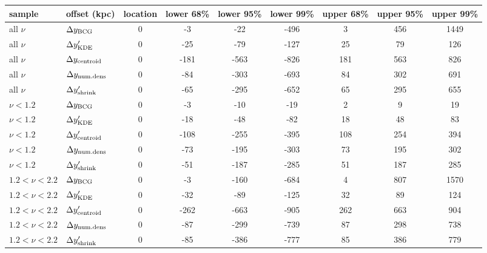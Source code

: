 \begin{tabular}{llccccccc}
\toprule
sample & offset (kpc) &  location &  lower 68\% &  lower 95\% &  lower 99\% &  upper 68\% &  upper 95\% &  upper 99\% \\
\midrule
all $\nu$ & $\Delta y_{\rm BCG}$               &         0 &          -3 &         -22 &        -496 &           3 &         456 &        1449 \\
all $\nu$ & $\Delta y_{\rm KDE}'$              &         0 &         -25 &         -79 &        -127 &          25 &          79 &         126 \\
all $\nu$ & $\Delta y_{\rm centroid}$     &  0 &         -181 &-563 &        -826 &          181&         563&         826\\
all $\nu$ & $\Delta y_{\rm num. dens}$         &        0 &         -84 &        -303 &        -693 &          84 &         302 &         691 \\
all $\nu$ & $\Delta y_{\rm shrink}'$           &        0 &         -65 &        -295 &        -652 &          65 &         295 &         655 \\
\midrule
$\nu < 1.2$ & $\Delta y_{\rm BCG}$             &        0 &          -3 &         -10 &         -19 &           2 &           9 &          19 \\
$\nu < 1.2$ & $\Delta y_{\rm KDE}'$            &         0 &         -18 &         -48 &         -82 &          18 &          48 &          83 \\
$\nu < 1.2$ & $\Delta y_{\rm centroid}'$        &        0 &        -108 &        -255 &        -395 &         108 &         254 &         394 \\
$\nu < 1.2$ & $\Delta y_{\rm num. dens}$       &        0 &         -73 &        -195 &        -303 &          73 &         195 &         302 \\
$\nu < 1.2$ & $\Delta y_{\rm shrink}'$         &         0 &         -51 &        -187 &        -285 &          51 &         187 &         285 \\
\midrule
$1.2 < \nu < 2.2$ & $\Delta y_{\rm BCG}$       &         0 &          -3 &        -160 &        -684 &           4 &         807 &        1570 \\
$1.2 < \nu < 2.2$ & $\Delta y_{\rm KDE}'$      &        0 &         -32 &         -89 &        -125 &          32 &          89 &         124 \\
$1.2 < \nu < 2.2$ & $\Delta y_{\rm centroid}'$  &         0 &        -262 &        -663 &        -905 &         262 &         663 &         904 \\
$1.2 < \nu < 2.2$ & $\Delta y_{\rm num. dens}$ &         0 &         -87 &        -299 &        -739 &          87 &         298 &         738 \\
$1.2 < \nu < 2.2$ & $\Delta y_{\rm shrink}'$   &        0 &         -85 &        -386 &        -777 &          85 &         386 &         779 \\
\bottomrule
\end{tabular}
